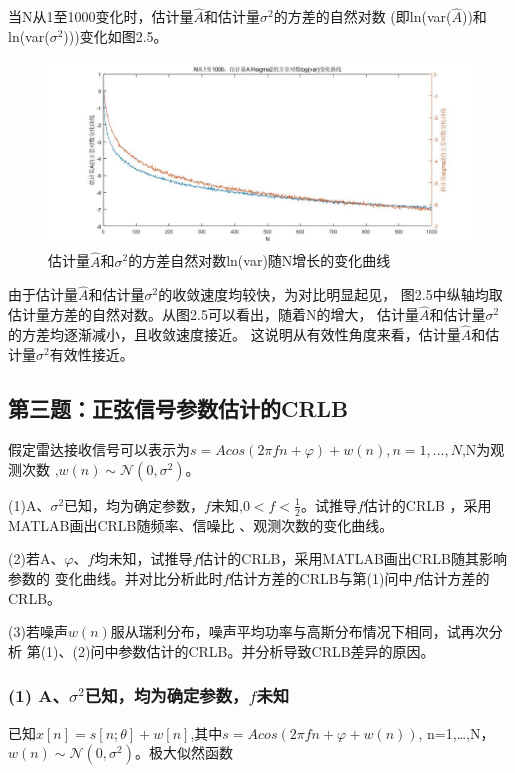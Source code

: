 \documentclass[fontset=windows]{article}
\numberwithin{figure}{section}
\begin{document}
当N从1至1000变化时，估计量\(\hat{A}\)和估计量\(\sigma^2\)的方差的自然对数
(即ln(var(\(\hat{A}\)))和ln(var(\(\sigma^2\))))变化如图2.5。

\begin{figure}[H]
	\centering
	\includegraphics[scale=0.4]{fig2.5.jpg}
	\caption{估计量\(\hat{A}\)和\(\sigma^2\)的方差自然对数ln(var)随N增长的变化曲线}
	\label{2.5}
\end{figure}

由于估计量\(\hat{A}\)和估计量\(\sigma^2\)的收敛速度均较快，为对比明显起见，
图2.5中纵轴均取估计量方差的自然对数。从图2.5可以看出，随着N的增大，
估计量\(\hat{A}\)和估计量\(\sigma^2\)的方差均逐渐减小，且收敛速度接近。
这说明从有效性角度来看，估计量\(\hat{A}\)和估计量\(\sigma^2\)有效性接近。

\subsection{第三题：正弦信号参数估计的CRLB}
假定雷达接收信号可以表示为\(s=Acos(2\pi fn+\varphi)+w(n),n=1,…,N\),N为观测次数
,\(w(n)\sim\mathcal{N}(0,\sigma^2)\)。

(1)A、\(\sigma^2\)已知，均为确定参数，\(f\)未知,\(0<f<\frac{1}{2}\)。试推导\(f\)估计的CRLB
，采用MATLAB画出CRLB随频率、信噪比 、观测次数的变化曲线。

(2)若A、\(\varphi\)、\(f\)均未知，试推导\(f\)估计的CRLB，采用MATLAB画出CRLB随其影响参数的
变化曲线。并对比分析此时\(f\)估计方差的CRLB与第(1)问中\(f\)估计方差的CRLB。

(3)若噪声\(w(n)\)服从瑞利分布，噪声平均功率与高斯分布情况下相同，试再次分析
第(1)、(2)问中参数估计的CRLB。并分析导致CRLB差异的原因。

\subsubsection*{(1) A、\(\sigma^2\)已知，均为确定参数，\(f\)未知}

已知\(x[n]=s[n;\theta]+w[n]\),其中\(s=Acos(2\pi f n +\varphi + w(n))\),
n=1,…,N，\(w(n)\sim \mathcal{N} (0,\sigma^2)\)。极大似然函数
\end{document}
